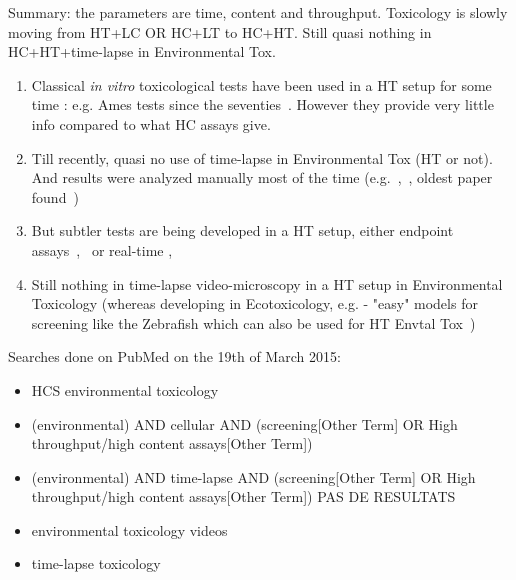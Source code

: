 \documentclass[12pt]{article}
\begin{document}
Summary: the parameters are time, content and throughput. Toxicology is slowly moving from HT+LC OR HC+LT to HC+HT. Still quasi nothing in HC+HT+time-lapse in Environmental Tox.
\begin{enumerate}
\item Classical \textit{in vitro} toxicological tests have been used in a HT setup for some time : e.g. Ames tests since the seventies~\cite{pmid19157069}. However they provide very little info compared to what HC assays give.
\item Till recently, quasi no use of time-lapse in Environmental Tox (HT or not). And results were analyzed manually most of the time (e.g.~\cite{pmid17949680},~\cite{pmid15388243}, oldest paper found~\cite{pmid24263567}) %
\item But subtler tests are being developed in a HT setup, either endpoint assays~\cite{pmid24772387},~\cite{pmid24610750} or real-time \cite{pmid21516415}, \cite{pmid24141454}
\item Still nothing in time-lapse video-microscopy in a HT setup in Environmental Toxicology (whereas developing in Ecotoxicology, e.g. \cite{pmid24510773} - "easy" models for screening like the Zebrafish which can also be used for HT Envtal Tox~\cite{pmid25678986})
\end{enumerate} 


Searches done on PubMed on the 19th of March 2015:
\begin{itemize}
\item HCS environmental toxicology
\item (environmental) AND cellular AND (screening[Other Term] OR High throughput/high content assays[Other Term])
\item (environmental) AND time-lapse AND (screening[Other Term] OR High throughput/high content assays[Other Term])  PAS DE RESULTATS
\item environmental toxicology videos
\item time-lapse toxicology
\end{itemize}
\end{document}
